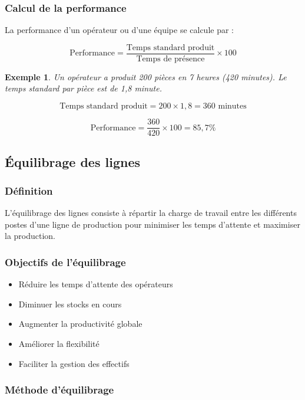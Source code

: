 \documentclass[a4paper,12pt]{article}
\newtheorem{exemple}{Exemple}[section]
\begin{document}
\subsubsection{Calcul de la performance}

La performance d'un opérateur ou d'une équipe se calcule par :

\[
\text{Performance} = \frac{\text{Temps standard produit}}{\text{Temps de présence}} \times 100
\]

\begin{exemple}
Un opérateur a produit 200 pièces en 7 heures (420 minutes). Le temps standard par pièce est de 1,8 minute.

\[
\text{Temps standard produit} = 200 \times 1,8 = 360 \text{ minutes}
\]

\[
\text{Performance} = \frac{360}{420} \times 100 = 85,7\%
\]
\end{exemple}

\subsection{Équilibrage des lignes}

\subsubsection{Définition}

L'équilibrage des lignes consiste à répartir la charge de travail entre les différents postes d'une ligne de production pour minimiser les temps d'attente et maximiser la production.

\subsubsection{Objectifs de l'équilibrage}

\begin{itemize}
    \item Réduire les temps d'attente des opérateurs
    \item Diminuer les stocks en cours
    \item Augmenter la productivité globale
    \item Améliorer la flexibilité
    \item Faciliter la gestion des effectifs
\end{itemize}

\subsubsection{Méthode d'équilibrage}
\end{document}
